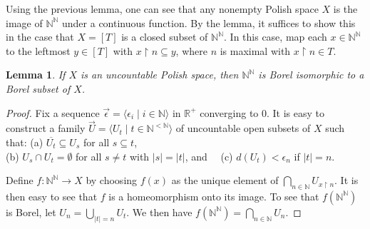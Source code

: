 \documentclass[10pt]{amsart}
\newcommand{\RR}{\mathbb{R}}
\newcommand{\NN}{\mathbb{N}}
\newtheorem{lemma}[theorem]{Lemma}
\theoremstyle{definition}
\theoremstyle{remark}
\begin{document}
Using the previous lemma, one can see that any nonempty Polish space $X$ is the image of $\NN^\NN$ under a continuous function. 
By the lemma, it suffices to show this in the case that $X=[T]$ is a closed subset of $\NN^\NN$. In this case, map each $x\in \NN^\NN$ to the leftmost $y\in [T]$ with $x{\upharpoonright}n \subseteq y$, where $n$ is maximal with $x{\upharpoonright}n\in T$. 

\begin{lemma} 
If $X$ is an uncountable Polish space, then $\NN^\NN$ is Borel isomorphic to a Borel subset of $X$. 
\end{lemma} 
\begin{proof} 
Fix a sequence $\vec{\epsilon}=\langle \epsilon_i \mid i\in\NN\rangle$ in $\RR^+$ converging to $0$. 
It is easy to construct a family $\vec{U}=\langle U_t\mid t\in \NN^{<\NN}\rangle$ of uncountable open subsets of $X$ such that: 
(a) $\overline{U_t}\subseteq U_s$ for all $s\subseteq t$, \\ 
(b) $U_s\cap U_t=\emptyset$ for all $s\neq t$ with $|s|=|t|$, and \ \  (c) $d(U_t)<\epsilon_n$ if $|t|=n$. 

Define $f\colon \NN^\NN\rightarrow X$ by choosing $f(x)$ as the unique element of $\bigcap_{n\in \NN} U_{x{\upharpoonright}n}$. 
It is then easy to see that $f$ is a homeomorphism onto its image. 
To see that $f(\NN^\NN)$ is Borel, let $U_n=\bigcup_{|t|=n} U_t$. We then have $f(\NN^\NN)=\bigcap_{n\in\NN} U_n$. 
\end{proof} 
\end{document}
